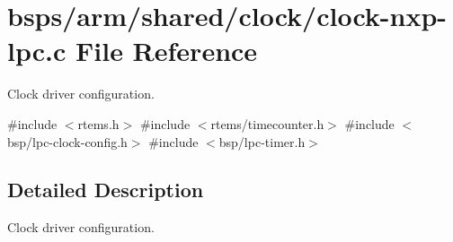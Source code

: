 \hypertarget{clock-nxp-lpc_8c}{}\section{bsps/arm/shared/clock/clock-\/nxp-\/lpc.c File Reference}
\label{clock-nxp-lpc_8c}


Clock driver configuration.  


{\ttfamily \#include $<$rtems.\+h$>$}\newline
{\ttfamily \#include $<$rtems/timecounter.\+h$>$}\newline
{\ttfamily \#include $<$bsp/lpc-\/clock-\/config.\+h$>$}\newline
{\ttfamily \#include $<$bsp/lpc-\/timer.\+h$>$}\newline


\subsection{Detailed Description}
Clock driver configuration. 

